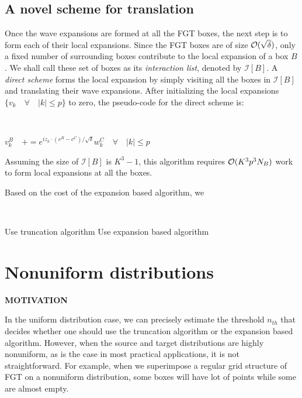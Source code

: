 \documentclass[conference]{IEEEtran}
\begin{document}
\subsection{A novel scheme for translation} 
Once the wave expansions are formed at all the FGT boxes, the next step is to form each of their local expansions. Since the FGT boxes are of size $\mathcal{O}(\sqrt{\delta})$, only a fixed number of surrounding boxes contribute to the local expansion of a box $B$. We shall call these set of boxes as its {\em interaction list}, denoted by $\mathcal{I} [B]$. A {\em direct scheme} forms the local expansion by simply visiting all the boxes in $\mathcal{I}[B]$ and translating their wave expansions. After initializing the local expansions $\{ v_k \quad \forall \quad |k| \leq p \}$ to zero, the pseudo-code for the direct scheme is:
%
{\tt
\begin{algorithmic}
           \STATE $ v_k^B \quad += e^{i z_k \cdot(c^B - c^C)/\sqrt{\delta}} w_k^C \quad \forall \quad |k| \leq p$
       \ENDFOR
\STATE
\end{algorithmic}
}
%
Assuming the size of $\mathcal{I}[B]$ is $K^3 - 1$, this algorithm requires $\mathcal{O}(K^3 p^3 N_B)$ work to form local expansions at all the boxes. 
%


Based on the cost of the expansion based algorithm, we 

{\tt
\begin{algorithmic}
\STATE
     \STATE Use truncation algorithm 
  \ELSE 
     \STATE Use expansion based algorithm
  \ENDIF
\STATE
\end{algorithmic}
}



\section{Nonuniform distributions} 

{\bf MOTIVATION}

In the uniform distribution case, we can precisely estimate the threshold $n_{th}$ that decides whether one should use the truncation algorithm or the expansion based algorithm. However, when the source and target distributions are highly nonuniform, as is the case in most practical applications, it is not straightforward. For example, when we superimpose a regular grid structure of FGT on a nonuniform distribution, some boxes will have lot of points while some are almost empty. 
\end{document}
